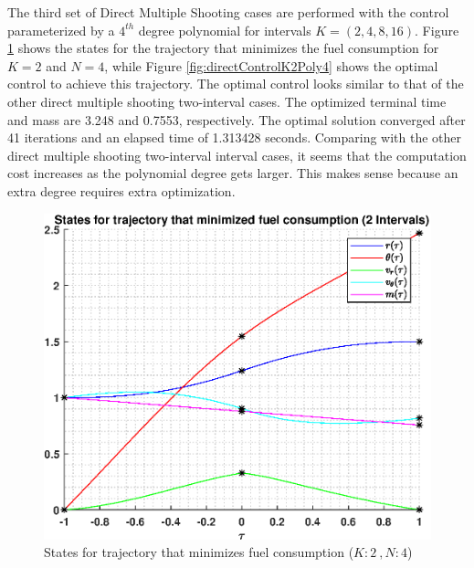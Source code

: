 \documentclass[]{article}
\begin{document}
\FloatBarrier


The third set of Direct Multiple Shooting cases are performed with the control parameterized by a \(4^{th}\) degree polynomial for intervals \(K = (2,4,8,16)\). Figure \ref{fig:directStatesK2Poly4} shows the states for the trajectory that minimizes the fuel consumption for \(K = 2\) and  \(N = 4\), while Figure \ref{fig:directControlK2Poly4} shows the optimal control to achieve this trajectory. The optimal control looks similar to that of the other direct multiple shooting two-interval cases. The optimized terminal time and mass are 3.248 and 0.7553, respectively. The optimal solution converged after 41 iterations and an elapsed time of 1.313428 seconds. Comparing with the other direct multiple shooting two-interval interval cases, it seems that the computation cost increases as the polynomial degree gets larger. This makes sense because an extra degree requires extra optimization.
\begin{figure}
	\centering
	\includegraphics[scale=0.75]{directStatesK2Poly4.eps}
	\caption{States for trajectory that minimizes fuel consumption (\(K:2\ , N:4\))}
	\label{fig:directStatesK2Poly4}
\end{figure}
\end{document}
